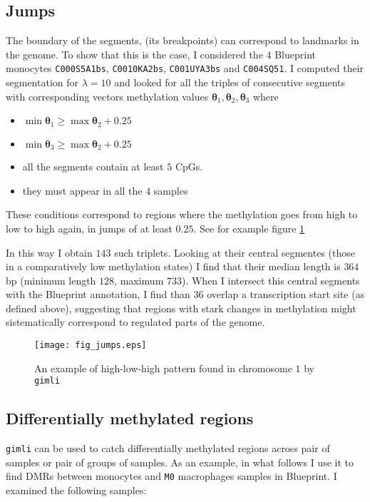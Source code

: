 \documentclass[12pt]{amsart}
\newcommand{\gimli}{\texttt{gimli}}
\begin{document}
\subsection{Jumps}

The boundary of the segments, (its  breakpoints)
can correspond to landmarks in the genome. To show that this is the case, 
I considered the 
$4$ Blueprint monocytes \texttt{C000S5A1bs}, \texttt{C0010KA2bs},
\texttt{C001UYA3bs} and \texttt{C004SQ51}.
I computed their segmentation for $\lambda=10$ and looked for all the triples of consecutive segments
with corresponding vectors methylation values $\pmb{\theta}_{1},\pmb{\theta}_{2},\pmb{\theta}_{3}$
where 
\begin{itemize}
\item{} $\min \pmb{\theta}_1 \geq \max \pmb{\theta}_2 + 0.25$
\item{} $\min \pmb{\theta}_{3} \geq \max \pmb{\theta}_2 + 0.25$
\item{} all the segments contain at least $5$ CpGs.
\item{} they must appear in all the 4 samples
\end{itemize}

These conditions correspond to regions where the methylation goes from 
high to low to high again,
in jumps of at least $0.25$.
See for example figure \ref{fig_jumps} 

In this way I obtain $143$ such triplets. Looking at their central segmentes
(those in a comparatively low methylation states) I find that their median length is
$364$bp (minimum length $128$, maximum $733$). When I intersect this central segments with the Blueprint
annotation, I find than $36$ overlap a transcription start site (as defined above), 
suggesting that regions with stark 
changes in methylation
might sistematically correspond to regulated parts of the genome.

\begin{figure}\label{fig_jumps}
\texttt{[image: fig\_jumps.eps]}
\caption{An example of high-low-high pattern found in chromosome $1$ by \gimli{}}
\end{figure}

\subsection{Differentially methylated regions}

\gimli{} can be used to catch differentially methylated regions across pair of samples
or pair of groups of samples.
As an example, in what follows I use it to find DMRs between monocytes and \texttt{M0} macrophages 
samples in Blueprint.  I examined the following samples:
\end{document}
